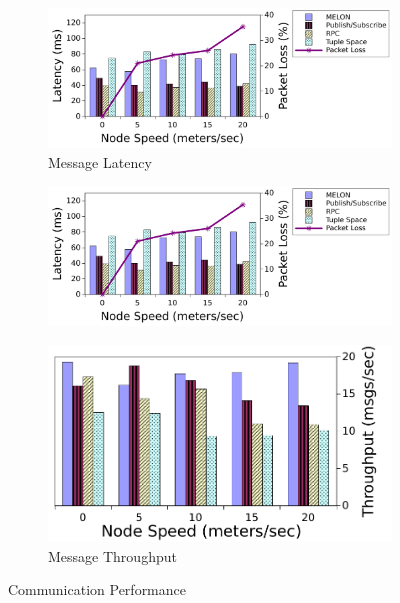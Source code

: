 \documentclass[lnicst]{svmultln}
\begin{document}
\begin{figure}
\centering

\begin{subfigure}{.41\textwidth}
\centering
\includegraphics[width = \linewidth, clip, trim = 0px 0px 160px 0px]{figures/latency.pdf}
\caption{Message Latency}
\label{fig:latency}
\end{subfigure}%
\begin{subfigure}{.18\textwidth}
\centering
\includegraphics[width = \linewidth, clip, trim = 390px 0px 0px 0px]{figures/latency.pdf}
\end{subfigure}%
\begin{subfigure}{.41\textwidth}
\centering
\includegraphics[width = \linewidth, clip, trim = 0px 0px 0px 0px]{figures/throughput.pdf}
\caption{Message Throughput}
\label{fig:throughput}
\end{subfigure}
\caption{Communication Performance}
\end{figure}
\end{document}
